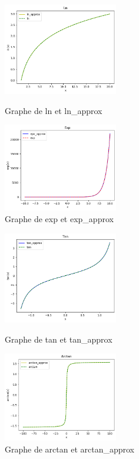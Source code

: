 \documentclass{article}
\begin{document}
\begin{itemize}
\begin{figure}[!h]

    \begin{minipage}[c]{.46\linewidth}
        \centering
        \includegraphics[width=50mm,scale=1.5]{res/ln_far.png}
        \caption{Graphe de ln et ln\_approx}
        \label{fig:graphe_ln}
    \end{minipage}
    \begin{minipage}[c]{.46\linewidth}
        \centering
        \includegraphics[width=50mm,scale=1.5]{res/exp_far.png}
        \caption{Graphe de exp et exp\_approx}
        \label{fig:graphe_exp}
    \end{minipage}
\end{figure}


\begin{figure}[!h]
    \begin{minipage}[c]{.46\linewidth}
        \centering
        \includegraphics[width=50mm,scale=1.5]{res/tan_far.png}
        \caption{Graphe de tan et tan\_approx}
        \label{fig:graphe_tan}
    \end{minipage}
    \begin{minipage}[c]{.46\linewidth}
        \centering
        \includegraphics[width=50mm,scale=1.5]{res/arctan_far.png}
        \caption{Graphe de arctan et arctan\_approx}
        \label{fig:graphe_arctan}
    \end{minipage}
\end{figure}


\end{itemize}
\end{document}
